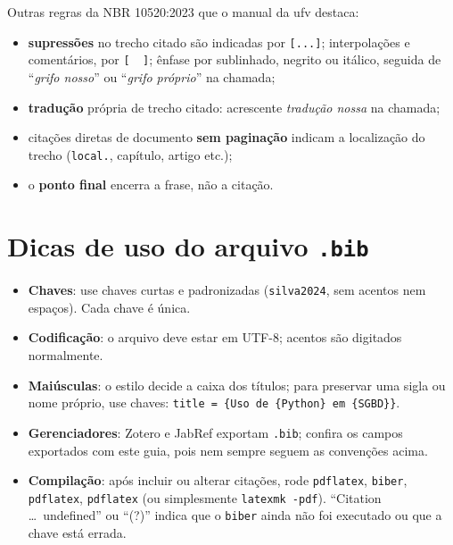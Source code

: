 Outras regras da NBR 10520:2023 que o manual da \ac{ufv} destaca:
\begin{itemize}
  \item \textbf{supressões} no trecho citado são indicadas por \texttt{[...]};
        interpolações e comentários, por \texttt{[~~]}; ênfase por sublinhado, negrito ou
        itálico, seguida de ``\emph{grifo nosso}'' ou ``\emph{grifo próprio}'' na chamada;
  \item \textbf{tradução} própria de trecho citado: acrescente \emph{tradução nossa} na chamada;
  \item citações diretas de documento \textbf{sem paginação} indicam a localização do
        trecho (\texttt{local.}, capítulo, artigo etc.);
  \item o \textbf{ponto final} encerra a frase, não a citação.
\end{itemize}

\section{Dicas de uso do arquivo \texttt{.bib}}

\begin{itemize}
  \item \textbf{Chaves}: use chaves curtas e padronizadas (\texttt{silva2024}, sem acentos
        nem espaços). Cada chave é única.
  \item \textbf{Codificação}: o arquivo deve estar em UTF-8; acentos são digitados normalmente.
  \item \textbf{Maiúsculas}: o estilo decide a caixa dos títulos; para preservar uma sigla
        ou nome próprio, use chaves: \texttt{title = \{Uso de \{Python\} em \{SGBD\}\}}.
  \item \textbf{Gerenciadores}: Zotero e JabRef exportam \texttt{.bib}; confira os campos
        exportados com este guia, pois nem sempre seguem as convenções acima.
  \item \textbf{Compilação}: após incluir ou alterar citações, rode
        \texttt{pdflatex}, \texttt{biber}, \texttt{pdflatex}, \texttt{pdflatex} (ou
        simplesmente \texttt{latexmk -pdf}). ``Citation \ldots\ undefined'' ou ``(?)''
        indica que o \texttt{biber} ainda não foi executado ou que a chave está errada.
\end{itemize}
